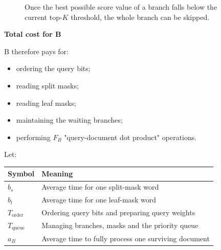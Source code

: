\begin{figure}[htbp]
\centering
{}
\caption{Once the best possible score value of a branch falls below the current top-\(K\) threshold, the whole branch can be skipped.}
\end{figure}





\textbf{Total cost for B}\par

B therefore pays for:

\begin{itemize}\setlength{\itemsep}{1pt}
\item ordering the query bits;
\item reading split masks;
\item reading leaf masks;
\item maintaining the waiting branches;
\item performing \(F_B\) "query-document dot product" operations.
\end{itemize}

Let:

\begin{center}
\begin{minipage}{\linewidth}
\small
\renewcommand{\arraystretch}{1.2}
\begin{tabular}{@{}p{.26\linewidth}p{.68\linewidth}@{}}
\toprule
Symbol & Meaning\\
\midrule
\(b_s\) & Average time for one split-mask word\\
\(b_l\) & Average time for one leaf-mask word\\
\(T_{\text{order}}\) & Ordering query bits and preparing query weights\\
\(T_{\text{queue}}\) & Managing branches, masks and the priority queue\\
\(a_B\) & Average time to fully process one surviving document\\
\bottomrule
\end{tabular}
\end{minipage}
\end{center}


